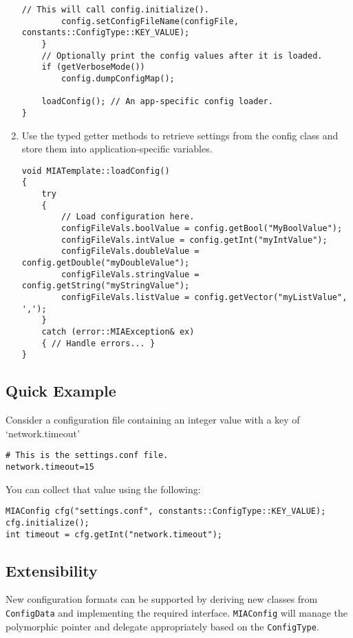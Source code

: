 \begin{enumerate}
\begin{lstlisting}[style=cppstyle]
		// This will call config.initialize().
		config.setConfigFileName(configFile, constants::ConfigType::KEY_VALUE);
	}
	// Optionally print the config values after it is loaded.
	if (getVerboseMode())
		config.dumpConfigMap();
	
	loadConfig(); // An app-specific config loader.
}
	\end{lstlisting}
	\item Use the typed getter methods to retrieve settings from the config class and store them into application-specific variables.
	\begin{lstlisting}[style=cppstyle]
void MIATemplate::loadConfig()
{
	try
	{
		// Load configuration here.
		configFileVals.boolValue = config.getBool("MyBoolValue");
		configFileVals.intValue = config.getInt("myIntValue");
		configFileVals.doubleValue = config.getDouble("myDoubleValue");
		configFileVals.stringValue = config.getString("myStringValue");
		configFileVals.listValue = config.getVector("myListValue", ',');
	}
	catch (error::MIAException& ex)
	{ // Handle errors... }
}
	\end{lstlisting}
\end{enumerate}

\subsection{Quick Example}

Consider a configuration file containing an integer value with a key of `network.timeout'
\begin{lstlisting}[style=cppstyle]
# This is the settings.conf file.
network.timeout=15
\end{lstlisting}
You can collect that value using the following: 
\begin{lstlisting}[style=cppstyle]
MIAConfig cfg("settings.conf", constants::ConfigType::KEY_VALUE);
cfg.initialize();
int timeout = cfg.getInt("network.timeout");
\end{lstlisting}

\subsection{Extensibility}

New configuration formats can be supported by deriving new classes from \texttt{ConfigData} and implementing the required interface. \texttt{MIAConfig} will manage the polymorphic pointer and delegate appropriately based on the \texttt{ConfigType}.
























